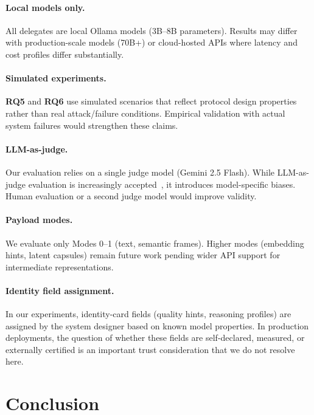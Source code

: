 \documentclass[11pt,a4paper]{article}
\newcommand{\RQ}[1]{\textbf{RQ#1}}
\begin{document}
\paragraph{Local models only.} All delegates are local Ollama models (3B--8B parameters). Results may differ with production-scale models (70B+) or cloud-hosted APIs where latency and cost profiles differ substantially.

\paragraph{Simulated experiments.} \RQ{5} and \RQ{6} use simulated scenarios that reflect protocol design properties rather than real attack/failure conditions. Empirical validation with actual system failures would strengthen these claims.

\paragraph{LLM-as-judge.} Our evaluation relies on a single judge model (Gemini 2.5 Flash). While LLM-as-judge evaluation is increasingly accepted~\citep{zheng2023judging}, it introduces model-specific biases. Human evaluation or a second judge model would improve validity.

\paragraph{Payload modes.} We evaluate only Modes 0--1 (text, semantic frames). Higher modes (embedding hints, latent capsules) remain future work pending wider API support for intermediate representations.

\paragraph{Identity field assignment.} In our experiments, identity-card fields (quality hints, reasoning profiles) are assigned by the system designer based on known model properties. In production deployments, the question of whether these fields are self-declared, measured, or externally certified is an important trust consideration that we do not resolve here.


\section{Conclusion}
\label{sec:conclusion}
\end{document}
